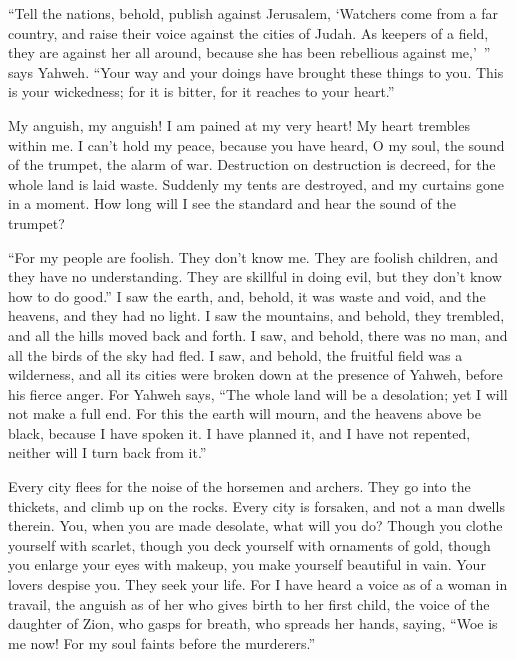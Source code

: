 {“Tell the nations, behold, publish against Jerusalem, ‘Watchers come from a far country, and raise their voice against the cities of Judah.
As keepers of a field, they are against her all around, because she has been rebellious against me,’ ” says Yahweh.
“Your way and your doings have brought these things to you. This is your wickedness; for it is bitter, for it reaches to your heart.”
\par }{\PP {}My anguish, my anguish! I am pained at my very heart! My heart trembles within me. I can’t hold my peace, because you have heard, O my soul, the sound of the trumpet, the alarm of war.
Destruction on destruction is decreed, for the whole land is laid waste. Suddenly my tents are destroyed, and my curtains gone in a moment.
How long will I see the standard and hear the sound of the trumpet?
\par }{\PP {}“For my people are foolish. They don’t know me. They are foolish children, and they have no understanding. They are skillful in doing evil, but they don’t know how to do good.”
I saw the earth, and, behold, it was waste and void, and the heavens, and they had no light.
I saw the mountains, and behold, they trembled, and all the hills moved back and forth.
I saw, and behold, there was no man, and all the birds of the sky had fled.
I saw, and behold, the fruitful field was a wilderness, and all its cities were broken down at the presence of Yahweh, before his fierce anger.
For Yahweh says, “The whole land will be a desolation; yet I will not make a full end.
For this the earth will mourn, and the heavens above be black, because I have spoken it. I have planned it, and I have not repented, neither will I turn back from it.”
\par }{\PP {}Every city flees for the noise of the horsemen and archers. They go into the thickets, and climb up on the rocks. Every city is forsaken, and not a man dwells therein.
You, when you are made desolate, what will you do? Though you clothe yourself with scarlet, though you deck yourself with ornaments of gold, though you enlarge your eyes with makeup, you make yourself beautiful in vain. Your lovers despise you. They seek your life.
For I have heard a voice as of a woman in travail, the anguish as of her who gives birth to her first child, the voice of the daughter of Zion, who gasps for breath, who spreads her hands, saying, “Woe is me now! For my soul faints before the murderers.”

}
